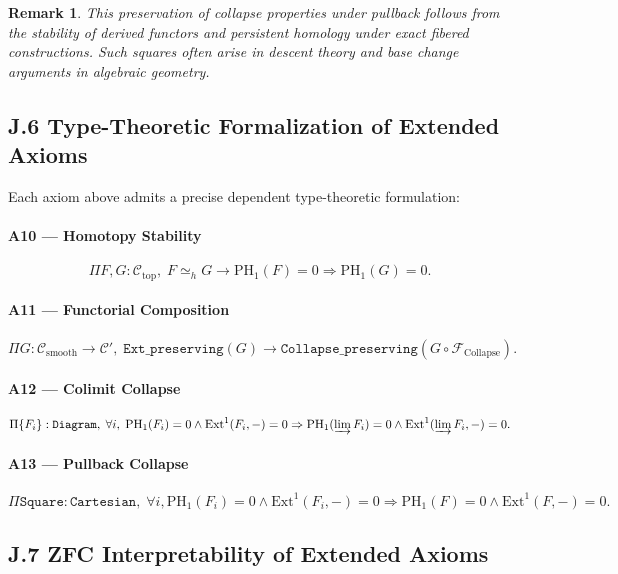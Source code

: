 \documentclass[11pt]{article}
\newtheorem{remark}[theorem]{Remark}
\begin{document}
\begin{remark}
This preservation of collapse properties under pullback follows from the stability of derived functors and persistent homology under exact fibered constructions. Such squares often arise in descent theory and base change arguments in algebraic geometry.
\end{remark}

\subsection*{J.6 Type-Theoretic Formalization of Extended Axioms}

Each axiom above admits a precise dependent type-theoretic formulation:

\paragraph{A10 — Homotopy Stability}
\[
\Pi F, G : \mathcal{C}_{\mathrm{top}}, \; F \simeq_h G \to \mathrm{PH}_1(F) = 0 \Rightarrow \mathrm{PH}_1(G) = 0.
\]

\paragraph{A11 — Functorial Composition}
\[
\Pi G : \mathcal{C}_{\mathrm{smooth}} \to \mathcal{C}', \;
\texttt{Ext\_preserving}(G) \to \texttt{Collapse\_preserving}(G \circ \mathcal{F}_{\mathrm{Collapse}}).
\]

\paragraph{A12 — Colimit Collapse}
\[
\Pi \{ F_i \} : \texttt{Diagram}, \;
\forall i, \; \mathrm{PH}_1(F_i) = 0 \wedge \mathrm{Ext}^1(F_i, -) = 0 \Rightarrow \mathrm{PH}_1(\varinjlim F_i) = 0 \wedge \mathrm{Ext}^1(\varinjlim F_i, -) = 0.
\]

\paragraph{A13 — Pullback Collapse}
\[
\Pi \texttt{Square} : \texttt{Cartesian}, \;
\forall i, \mathrm{PH}_1(F_i) = 0 \wedge \mathrm{Ext}^1(F_i, -) = 0 \Rightarrow \mathrm{PH}_1(F) = 0 \wedge \mathrm{Ext}^1(F, -) = 0.
\]

\subsection*{J.7 ZFC Interpretability of Extended Axioms}
\end{document}

